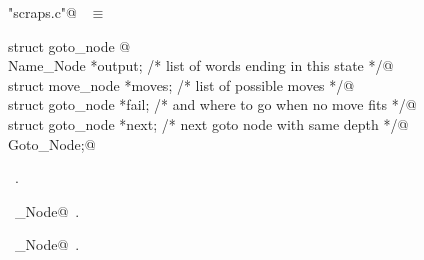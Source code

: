 \documentclass{report}
\begin{document}
\begin{flushleft} \small
\begin{minipage}{\linewidth} \label{scrap214}
\verb@"scraps.c"@\nobreak\ {\footnotesize {} }$\equiv$
\vspace{-1ex}
\begin{list}{}{} \item
\mbox{}\verb@typedef struct goto_node {@\\
\mbox{}\verb@  Name_Node *output;            /* list of words ending in this state */@\\
\mbox{}\verb@  struct move_node *moves;      /* list of possible moves */@\\
\mbox{}\verb@  struct goto_node *fail;       /* and where to go when no move fits */@\\
\mbox{}\verb@  struct goto_node *next;       /* next goto node with same depth */@\\
\mbox{}\verb@} Goto_Node;@\\
\mbox{}\verb@@{\NWsep}
\end{list}
\vspace{-1ex}
\footnotesize\addtolength{\baselineskip}{-1ex}
\begin{list}{}{\setlength{\itemsep}{-\parsep}\setlength{\itemindent}{-\leftmargin}}
\item \NWtxtFileDefBy\ .
\end{list}
\vspace{-2ex}
\footnotesize\addtolength{\baselineskip}{-1ex}
\begin{list}{}{\setlength{\itemsep}{-\parsep}\setlength{\itemindent}{-\leftmargin}}
\item \NWtxtIdentsDefed\nobreak\  \verb@Goto_Node@\nobreak\ .\end{list}
\vspace{-2ex}
\footnotesize\addtolength{\baselineskip}{-1ex}
\begin{list}{}{\setlength{\itemsep}{-\parsep}\setlength{\itemindent}{-\leftmargin}}
\item \NWtxtIdentsUsed\nobreak\  \verb@Name_Node@\nobreak\ .\end{list}
\end{minipage}\\[4ex]
\end{flushleft}
\end{document}
